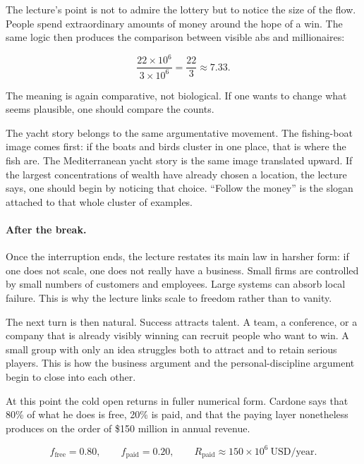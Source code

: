 The lecture's point is not to admire the lottery but to notice the size of the flow. People spend extraordinary amounts of money around the hope of a win. The same logic then produces the comparison between visible abs and millionaires:

\begin{equation}
\frac{22\times 10^6}{3\times 10^6}
=
\frac{22}{3}
\approx 7.33.
\end{equation}

The meaning is again comparative, not biological. If one wants to change what seems plausible, one should compare the counts.

The yacht story belongs to the same argumentative movement. The fishing-boat image comes first: if the boats and birds cluster in one place, that is where the fish are. The Mediterranean yacht story is the same image translated upward. If the largest concentrations of wealth have already chosen a location, the lecture says, one should begin by noticing that choice. ``Follow the money'' is the slogan attached to that whole cluster of examples.

\paragraph{After the break.}
Once the interruption ends, the lecture restates its main law in harsher form: if one does not scale, one does not really have a business. Small firms are controlled by small numbers of customers and employees. Large systems can absorb local failure. This is why the lecture links scale to freedom rather than to vanity.

The next turn is then natural. Success attracts talent. A team, a conference, or a company that is already visibly winning can recruit people who want to win. A small group with only an idea struggles both to attract and to retain serious players. This is how the business argument and the personal-discipline argument begin to close into each other.

At this point the cold open returns in fuller numerical form. Cardone says that 80\% of what he does is free, 20\% is paid, and that the paying layer nonetheless produces on the order of \$150 million in annual revenue.

\begin{equation}
f_{\text{free}}=0.80,
\qquad
f_{\text{paid}}=0.20,
\qquad
R_{\text{paid}}\approx 150\times 10^6\ \text{USD/year}.
\end{equation}

